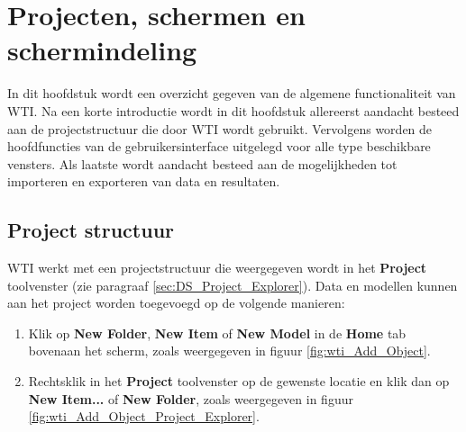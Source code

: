 
\chapter{Projecten, schermen en schermindeling}
\label{ch:general}

In dit hoofdstuk wordt een overzicht gegeven van de algemene functionaliteit van WTI. Na een korte introductie wordt in dit hoofdstuk allereerst aandacht besteed aan de projectstructuur die door WTI wordt gebruikt. Vervolgens worden de hoofdfuncties van de gebruikersinterface uitgelegd voor alle type beschikbare vensters. Als laatste wordt aandacht besteed aan de mogelijkheden tot importeren en exporteren van data en resultaten.

\section{Project structuur}
	\label{sec:DS_Project_Structure}
WTI werkt met een projectstructuur die weergegeven wordt in het \textbf{Project} toolvenster (zie paragraaf \ref{sec:DS_Project_Explorer}). Data en modellen kunnen aan het project worden toegevoegd op de volgende manieren:

\begin{enumerate}
	\item Klik op \textbf{New Folder}, \textbf{New Item} of \textbf{New Model} in de \textbf{Home} tab bovenaan het scherm, zoals weergegeven in figuur \ref{fig:wti_Add_Object}.
	\item Rechtsklik in het \textbf{Project} toolvenster op de gewenste locatie en klik dan op \textbf{New Item...} of \textbf{New Folder}, zoals weergegeven in figuur \ref{fig:wti_Add_Object_Project_Explorer}.
\end{enumerate}

